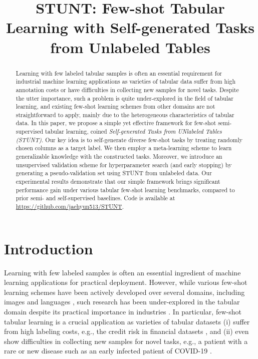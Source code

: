 \title{STUNT: Few-shot Tabular Learning with Self-generated Tasks from Unlabeled Tables}

\begin{abstract}
Learning with few labeled tabular samples is often an essential requirement for industrial machine learning applications as varieties of tabular data suffer from high annotation costs or have difficulties in collecting new samples for novel tasks. Despite the utter importance, such a problem is quite under-explored in the field of tabular learning, and existing few-shot learning schemes from other domains are not straightforward to apply, mainly due to the heterogeneous characteristics of tabular data. In this paper, we propose a simple yet effective framework for few-shot semi-supervised tabular learning, coined \emph{Self-generated Tasks from UNlabeled Tables (STUNT)}. Our key idea is to self-generate diverse few-shot tasks by treating randomly chosen columns as a target label. We then employ a meta-learning scheme to learn generalizable knowledge with the constructed tasks. Moreover, we introduce an unsupervised validation scheme for hyperparameter search (and early stopping) by generating a pseudo-validation set using STUNT from unlabeled data. Our experimental results demonstrate that our simple framework brings significant performance gain under various tabular few-shot learning benchmarks, compared to prior semi- and self-supervised baselines. Code is available at \url{https://github.com/jaehyun513/STUNT}.
\end{abstract}

\section{Introduction}
\label{sec:intro}
Learning with few labeled samples is often an essential ingredient of machine learning applications for practical deployment. However, while various few-shot learning schemes have been actively developed over several domains, including images \citep{chen2019closer} and languages \citep{min2022noisy}, such research has been under-explored in the tabular domain despite its practical importance in industries \citep{huifeng2017deepfm,zhang2020recsys,ulmer2020trust}. In particular, few-shot tabular learning is a crucial application as varieties of tabular datasets (i) suffer from high labeling costs, e.g., the credit risk in financial datasets \citep{clements2020financial}, and (ii) even show difficulties in collecting new samples for novel tasks, e.g., a patient with a rare or new disease \citep{peplow2016the} such as an early infected patient of COVID-19 \citep{zhou2020pneumonia}. 

